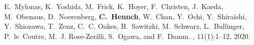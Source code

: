 \documentclass[11pt, a4paper, roman]{moderncv}        %
\renewcommand*{\listitemsymbol}{$-$ }
\renewcommand*{\cvlistitem}[2][.1em]{%
  \cvitem[#1]{}{\listitemsymbol\begin{minipage}[t]{\listitemcolumnwidth}#2\end{minipage}}}
\renewcommand*{\bibliographyitemlabel}{[\arabic{enumiv}]}
\begin{document}




\renewcommand{\refname}{Publikationen}
\begin{thebibliography}{1}

E.~Mylonas, K.~Yoshida, M.~Frick, K.~Hoyer, F.~Christen, J.~Kaeda, M.~Obenaus,
  D.~Noerenberg, \textbf{C.~Hennch}, W.~Chan, Y.~Ochi, Y.~Shiraishi, Y.~Shiozawa,
  T.~Zenz, C.~C. Oakes, B.~Sawitzki, M.~Schwarz, L.~Bullinger, P.~le~Coutre,
  M.~J. Rose-Zerilli, S.~Ogawa, and F.~Damm.
, 11(1):1--12, 2020.

\end{thebibliography}
\end{document}
